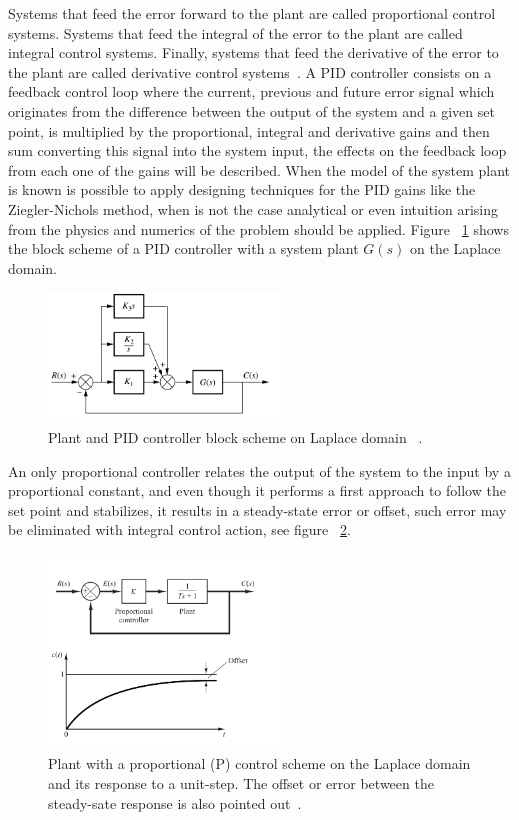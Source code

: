 Systems that feed the error forward to the plant are called proportional control systems. Systems that feed the integral of the error to the plant are called integral control systems. Finally, systems that feed the derivative of the error to the plant are called derivative control systems~\cite[Chapter ~9]{Nise}. A PID controller consists on a feedback control loop where the current, previous and future error signal which originates from the difference between the output of the system and a given set point, is multiplied by the proportional, integral and derivative gains  and then sum converting this signal into the system input, the effects on the feedback loop from each one of the gains will be described. When the model of the system plant is known is possible to apply designing techniques for the PID gains like the Ziegler-Nichols method, when is not the case analytical or even intuition arising from the physics and numerics of the problem should be applied. Figure ~\ref{PID_scheme} shows the block scheme of a PID controller with a system plant $G(s)$ on the Laplace domain.

\begin{figure}[h]
	\centering
	\includegraphics[width=0.55\textwidth]{Chp2/PID_scheme.png}
	\caption{ Plant and PID controller block scheme on Laplace domain ~\cite[Chapter~ 9]{Nise}. \label{PID_scheme}}
\end{figure}

 An only  proportional controller   relates the output of the system to the input by a proportional constant, and even though it performs a first approach to follow the  set point and stabilizes,  it results in a steady-state error or offset, such error may be eliminated with integral control action, see figure ~\ref{propGain}.
\smallskip

\begin{figure}[h]
	\centering
		\includegraphics[width=0.55\textwidth]{Chp2/propgain.png}
	\caption{ Plant with a proportional (P) control  scheme on the Laplace domain and its response to a unit-step. The offset or error between the steady-sate response is also pointed out~\cite[Chapter~ 5]{Ogata2009}. \label{propGain}}
\end{figure}


